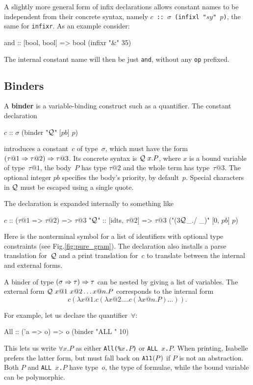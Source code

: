 A slightly more general form of infix declarations allows constant
names to be independent from their concrete syntax, namely \texttt{$c$
  ::\ $\sigma$\ (infixl "$sy$" $p$)}, the same for \texttt{infixr}.  As
an example consider:
\begin{ttbox}
and :: [bool, bool] => bool  (infixr "&" 35)
\end{ttbox}
The internal constant name will then be just \texttt{and}, without any
\texttt{op} prefixed.


\subsection{Binders}
\begingroup
\def\Q{{\cal Q}}
A {\bf binder} is a variable-binding construct such as a quantifier.  The
constant declaration
\begin{ttbox}
\(c\) :: \(\sigma\)   (binder "\(\Q\)" [\(pb\)] \(p\))
\end{ttbox}
introduces a constant~$c$ of type~$\sigma$, which must have the form
$(\tau@1 \To \tau@2) \To \tau@3$.  Its concrete syntax is $\Q~x.P$, where
$x$ is a bound variable of type~$\tau@1$, the body~$P$ has type $\tau@2$
and the whole term has type~$\tau@3$.  The optional integer $pb$
specifies the body's priority, by default~$p$.  Special characters
in $\Q$ must be escaped using a single quote.

The declaration is expanded internally to something like
\begin{ttbox}
\(c\)\hskip3pt    :: (\(\tau@1\) => \(\tau@2\)) => \(\tau@3\)
"\(\Q\)"  :: [idts, \(\tau@2\)] => \(\tau@3\)   ("(3\(\Q\)_./ _)" [0, \(pb\)] \(p\))
\end{ttbox}
Here  is the nonterminal symbol for a list of identifiers with
optional type constraints (see Fig.\ts\ref{fig:pure_gram}).  The
declaration also installs a parse translation
for~$\Q$ and a print translation for~$c$ to
translate between the internal and external forms.

A binder of type $(\sigma \Rightarrow \tau) \Rightarrow \tau$ can be nested by giving a
list of variables.  The external form $\Q~x@1~x@2 \ldots x@n. P$
corresponds to the internal form
\[ c(\lambda x@1. c(\lambda x@2. \ldots c(\lambda x@n. P) \ldots)). \]

\medskip
For example, let us declare the quantifier~$\forall$:
\begin{ttbox}
All :: ('a => o) => o   (binder "ALL " 10)
\end{ttbox}
This lets us write $\forall x.P$ as either {\tt All(\%$x$.$P$)} or {\tt ALL
  $x$.$P$}.  When printing, Isabelle prefers the latter form, but must fall
back on ${\tt All}(P)$ if $P$ is not an abstraction.  Both $P$ and {\tt ALL
  $x$.$P$} have type~$o$, the type of formulae, while the bound variable
can be polymorphic.
\endgroup

